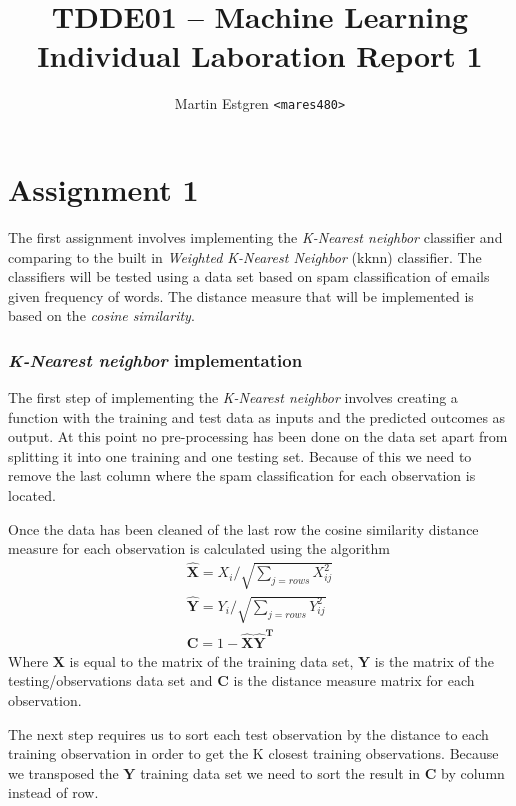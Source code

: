 \documentclass[a4paper,12pt]{article}
\title{TDDE01 -- Machine Learning \\
       Individual Laboration Report 1}
\author{Martin Estgren \texttt{<mares480>}}
\begin{document}
    \maketitle %
\section{Assignment 1}

The first assignment involves implementing the \textit{K-Nearest neighbor} classifier and comparing to the built in \textit{Weighted K-Nearest Neighbor} (kknn) classifier. The classifiers will be tested using a data set based on spam classification of emails given frequency of words. The distance measure that will be implemented is based on the \textit{cosine similarity}. 

\subsubsection{\textit{K-Nearest neighbor} implementation}

The first step of implementing the \textit{K-Nearest neighbor} involves creating a function with the training and test data as inputs and the predicted outcomes as output. At this point no pre-processing has been done on the data set apart from splitting it into one training and one testing set. Because of this we need to remove the last column where the spam classification for each observation is located. 

Once the data has been cleaned of the last row the cosine similarity distance measure for each observation is calculated using the algorithm
\begin{align*}
  \widehat{\mathbf{X}} = {X_i}/\sqrt{\sum_{j = rows}{X_{ij}^2}} \\
  \widehat{\mathbf{Y}} = {Y_i}/\sqrt{\sum_{j = rows}{Y_{ij}^2}} \\
  \textbf{C} = 1 - \widehat{\mathbf{X}}\widehat{\mathbf{Y}}^\textbf{T}
  \end{align*}
Where \(\mathbf{X}\) is equal to the matrix of the training data set, \(\mathbf{Y}\) is the matrix of the testing/observations data set and  \(\mathbf{C}\) is the distance measure matrix for each observation.

The next step requires us to sort each test observation by the distance to each training observation in order to get the K closest training observations. Because we transposed the \( \mathbf{Y}\) training data set we need to sort the result in \(\mathbf{C}\) by column instead of row.
\end{document}
